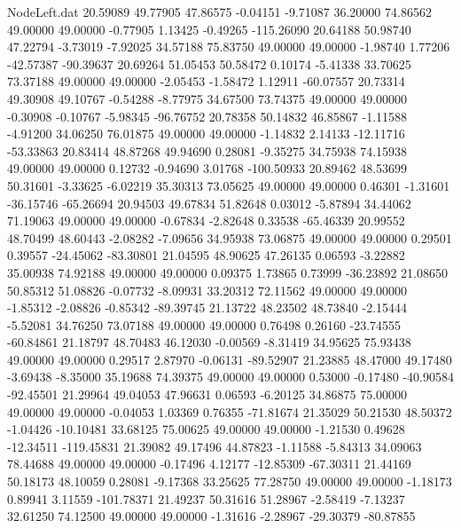 \begin{filecontents}{NodeLeft.dat}
  20.59089   49.77905   47.86575    -0.04151   -9.71087   36.20000   74.86562   49.00000   49.00000   -0.77905    1.13425   -0.49265 -115.26090
  20.64188   50.98740   47.22794    -3.73019   -7.92025   34.57188   75.83750   49.00000   49.00000   -1.98740    1.77206  -42.57387  -90.39637
  20.69264   51.05453   50.58472     0.10174   -5.41338   33.70625   73.37188   49.00000   49.00000   -2.05453   -1.58472    1.12911  -60.07557
  20.73314   49.30908   49.10767    -0.54288   -8.77975   34.67500   73.74375   49.00000   49.00000   -0.30908   -0.10767   -5.98345  -96.76752
  20.78358   50.14832   46.85867    -1.11588   -4.91200   34.06250   76.01875   49.00000   49.00000   -1.14832    2.14133  -12.11716  -53.33863
  20.83414   48.87268   49.94690     0.28081   -9.35275   34.75938   74.15938   49.00000   49.00000    0.12732   -0.94690    3.01768 -100.50933
  20.89462   48.53699   50.31601    -3.33625   -6.02219   35.30313   73.05625   49.00000   49.00000    0.46301   -1.31601  -36.15746  -65.26694
  20.94503   49.67834   51.82648     0.03012   -5.87894   34.44062   71.19063   49.00000   49.00000   -0.67834   -2.82648    0.33538  -65.46339
  20.99552   48.70499   48.60443    -2.08282   -7.09656   34.95938   73.06875   49.00000   49.00000    0.29501    0.39557  -24.45062  -83.30801
  21.04595   48.90625   47.26135     0.06593   -3.22882   35.00938   74.92188   49.00000   49.00000    0.09375    1.73865    0.73999  -36.23892
  21.08650   50.85312   51.08826    -0.07732   -8.09931   33.20312   72.11562   49.00000   49.00000   -1.85312   -2.08826   -0.85342  -89.39745
  21.13722   48.23502   48.73840    -2.15444   -5.52081   34.76250   73.07188   49.00000   49.00000    0.76498    0.26160  -23.74555  -60.84861
  21.18797   48.70483   46.12030    -0.00569   -8.31419   34.95625   75.93438   49.00000   49.00000    0.29517    2.87970   -0.06131  -89.52907
  21.23885   48.47000   49.17480    -3.69438   -8.35000   35.19688   74.39375   49.00000   49.00000    0.53000   -0.17480  -40.90584  -92.45501
  21.29964   49.04053   47.96631     0.06593   -6.20125   34.86875   75.00000   49.00000   49.00000   -0.04053    1.03369    0.76355  -71.81674
  21.35029   50.21530   48.50372    -1.04426  -10.10481   33.68125   75.00625   49.00000   49.00000   -1.21530    0.49628  -12.34511 -119.45831
  21.39082   49.17496   44.87823    -1.11588   -5.84313   34.09063   78.44688   49.00000   49.00000   -0.17496    4.12177  -12.85309  -67.30311
  21.44169   50.18173   48.10059     0.28081   -9.17368   33.25625   77.28750   49.00000   49.00000   -1.18173    0.89941    3.11559 -101.78371
  21.49237   50.31616   51.28967    -2.58419   -7.13237   32.61250   74.12500   49.00000   49.00000   -1.31616   -2.28967  -29.30379  -80.87855

\end{filecontents}
